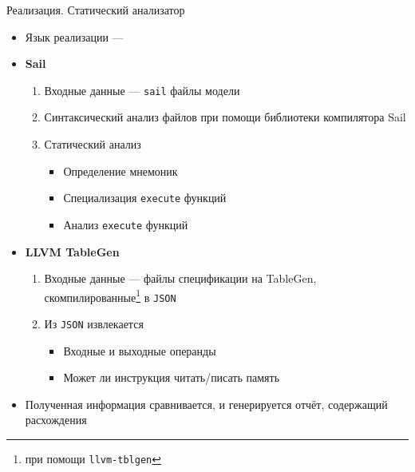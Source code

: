 \documentclass
  [ russian
  , aspectratio=169 %
  ] {beamer}
\begin{document}
\begin{frame}[fragile]{Реализация. Статический анализатор}

    \begin{itemize}
        \item Язык реализации --- \OCaml{}

        \item \textbf{Sail}
              \begin{enumerate}
                  \item Входные данные --- \texttt{sail} файлы модели
                  \item Синтаксический анализ файлов при помощи библиотеки компилятора Sail
                  \item Статический анализ
                        \begin{itemize}
                            \item Определение мнемоник
                            \item Специализация \texttt{execute} функций
                            \item Анализ \texttt{execute} функций
                        \end{itemize}
              \end{enumerate}

        \item \textbf{LLVM TableGen}
              \begin{enumerate}
                  \item Входные данные --- файлы спецификации на TableGen, скомпилированные\footnote[frame]{при помощи \texttt{llvm-tblgen}} в \texttt{JSON}
                  \item Из \texttt{JSON} извлекается
                        \begin{itemize}
                            \item Входные и выходные операнды
                            \item Может ли инструкция читать/писать память
                        \end{itemize}
              \end{enumerate}

        \item Полученная информация сравнивается, и генерируется отчёт, содержащий расхождения
    \end{itemize}

\end{frame}
\end{document}

